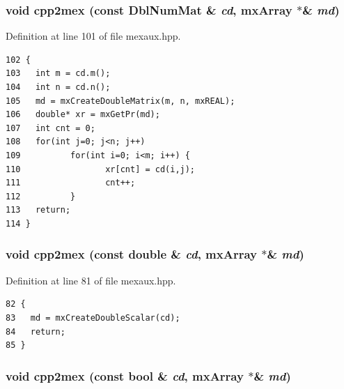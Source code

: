 \subsubsection{\setlength{\rightskip}{0pt plus 5cm}void cpp2mex (const Dbl\-Num\-Mat \& {\em cd}, mx\-Array $\ast$\& {\em md})\hspace{0.3cm}{\tt  [inline]}}\label{mexaux_8hpp_84b998c9856c1d9e6cdb762d2bbf58e6_84b998c9856c1d9e6cdb762d2bbf58e6}




Definition at line 101 of file mexaux.hpp.

\footnotesize\begin{verbatim}102 {
103   int m = cd.m();
104   int n = cd.n();
105   md = mxCreateDoubleMatrix(m, n, mxREAL);
106   double* xr = mxGetPr(md);
107   int cnt = 0;
108   for(int j=0; j<n; j++)
109          for(int i=0; i<m; i++) {
110                 xr[cnt] = cd(i,j);
111                 cnt++;
112          }
113   return;
114 }
\end{verbatim}\normalsize 


\subsubsection{\setlength{\rightskip}{0pt plus 5cm}void cpp2mex (const double \& {\em cd}, mx\-Array $\ast$\& {\em md})\hspace{0.3cm}{\tt  [inline]}}\label{mexaux_8hpp_da67a5b4a4401f6372381cf670b7cffc_da67a5b4a4401f6372381cf670b7cffc}




Definition at line 81 of file mexaux.hpp.

\footnotesize\begin{verbatim}82 {
83   md = mxCreateDoubleScalar(cd);
84   return;
85 }
\end{verbatim}\normalsize 


\subsubsection{\setlength{\rightskip}{0pt plus 5cm}void cpp2mex (const bool \& {\em cd}, mx\-Array $\ast$\& {\em md})\hspace{0.3cm}{\tt  [inline]}}\label{mexaux_8hpp_8a92ee2a2b0f5cbf7e675b55d15e8fa4_8a92ee2a2b0f5cbf7e675b55d15e8fa4}




